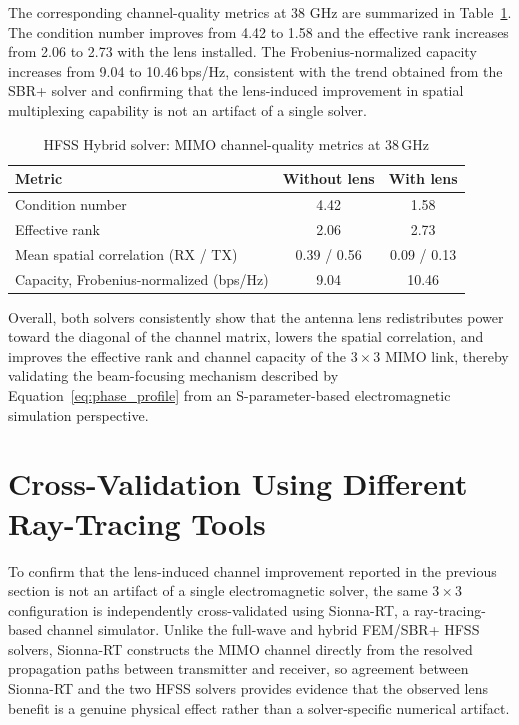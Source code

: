 The corresponding channel-quality metrics at 38 GHz are summarized in Table~\ref{table:hybrid_metrics}. The condition number improves from 4.42 to 1.58 and the effective rank increases from 2.06 to 2.73 with the lens installed. The Frobenius-normalized capacity increases from 9.04 to 10.46\,bps/Hz, consistent with the trend obtained from the SBR+ solver and confirming that the lens-induced improvement in spatial multiplexing capability is not an artifact of a single solver.

\begin{table}[h!]
    \begin{center}
        \caption{HFSS Hybrid solver: MIMO channel-quality metrics at 38\,GHz}
        \label{table:hybrid_metrics}
        \begin{tabular}{|l|c|c|}
            \hline
            \textbf{Metric} & \textbf{Without lens} & \textbf{With lens} \\
            \hline
            Condition number & 4.42 & 1.58 \\
            Effective rank & 2.06 & 2.73 \\
            Mean spatial correlation (RX / TX) & 0.39 / 0.56 & 0.09 / 0.13 \\
            Capacity, Frobenius-normalized (bps/Hz) & 9.04 & 10.46 \\
            \hline
        \end{tabular}
    \end{center}
\end{table}

Overall, both solvers consistently show that the antenna lens redistributes power toward the diagonal of the channel matrix, lowers the spatial correlation, and improves the effective rank and channel capacity of the $3\times3$ MIMO link, thereby validating the beam-focusing mechanism described by Equation~\ref{eq:phase_profile} from an S-parameter-based electromagnetic simulation perspective.


\section{Cross-Validation Using Different Ray-Tracing Tools}
To confirm that the lens-induced channel improvement reported in the previous section is not an artifact of a single electromagnetic solver, the same $3\times3$ configuration is independently cross-validated using Sionna-RT, a ray-tracing-based channel simulator. Unlike the full-wave and hybrid FEM/SBR+ HFSS solvers, Sionna-RT constructs the MIMO channel directly from the resolved propagation paths between transmitter and receiver, so agreement between Sionna-RT and the two HFSS solvers provides evidence that the observed lens benefit is a genuine physical effect rather than a solver-specific numerical artifact.

